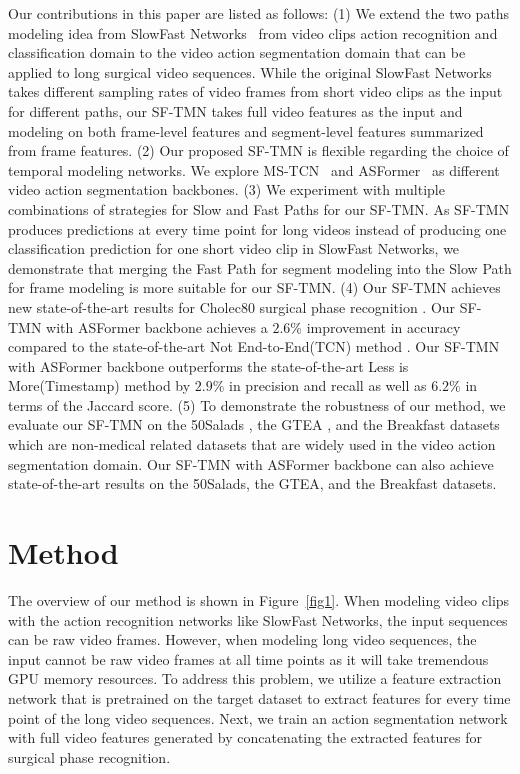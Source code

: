 \documentclass[sn-mathphys,Numbered]{sn-jnl}
\theoremstyle{thmstyleone}\newtheorem{theorem}{Theorem}\newtheorem{proposition}[theorem]{Proposition}
\theoremstyle{thmstyletwo}\newtheorem{example}{Example}\newtheorem{remark}{Remark}
\theoremstyle{thmstylethree}\newtheorem{definition}{Definition}
\begin{document}
Our contributions in this paper are listed as follows: (1) We extend the two paths modeling idea from SlowFast Networks~\cite{feichtenhofer2019slowfast} from video clips action recognition and classification domain to the video action segmentation domain that can be applied to long surgical video sequences. While the original SlowFast Networks takes different sampling rates of video frames from short video clips as the input for different paths, our SF-TMN takes full video features as the input and modeling on both frame-level features and segment-level features summarized from frame features. (2) Our proposed SF-TMN is flexible regarding the choice of temporal modeling networks. We explore MS-TCN~\cite{farha2019ms} and ASFormer~\cite{yi2021asformer} as different video action segmentation backbones. (3) We experiment with multiple combinations of strategies for Slow and Fast Paths for our SF-TMN. As SF-TMN produces predictions at every time point for long videos instead of producing one classification prediction for one short video clip in SlowFast Networks, we demonstrate that merging the Fast Path for segment modeling into the Slow Path for frame modeling is more suitable for our SF-TMN. (4) Our SF-TMN achieves new state-of-the-art results for Cholec80 surgical phase recognition \cite{twinanda2016endonet}. Our SF-TMN with ASFormer backbone achieves a $2.6\%$ improvement in accuracy compared to the state-of-the-art Not End-to-End(TCN) method \cite{yi2022not}. Our SF-TMN with ASFormer backbone outperforms the state-of-the-art Less is More(Timestamp) method \cite{wang2022less} by $2.9\%$ in precision and recall as well as $6.2\%$ in terms of the Jaccard score. (5) To demonstrate the robustness of our method, we evaluate our SF-TMN on the 50Salads \cite{stein2013combining}, the GTEA \cite{fathi2011learning}, and the Breakfast \cite{kuehne2014language} datasets which are non-medical related datasets that are widely used in the video action segmentation domain. Our SF-TMN with ASFormer backbone can also achieve state-of-the-art results on the 50Salads, the GTEA, and the Breakfast datasets.


\section{Method}
The overview of our method is shown in Figure~\ref{fig1}. When modeling video clips with the action recognition networks like SlowFast Networks, the input sequences can be raw video frames. However, when modeling long video sequences, the input cannot be raw video frames at all time points as it will take tremendous GPU memory resources. To address this problem, we utilize a feature extraction network that is pretrained on the target dataset to extract features for every time point of the long video sequences. Next, we train an action segmentation network with full video features generated by concatenating the extracted features for surgical phase recognition. 
\end{document}
